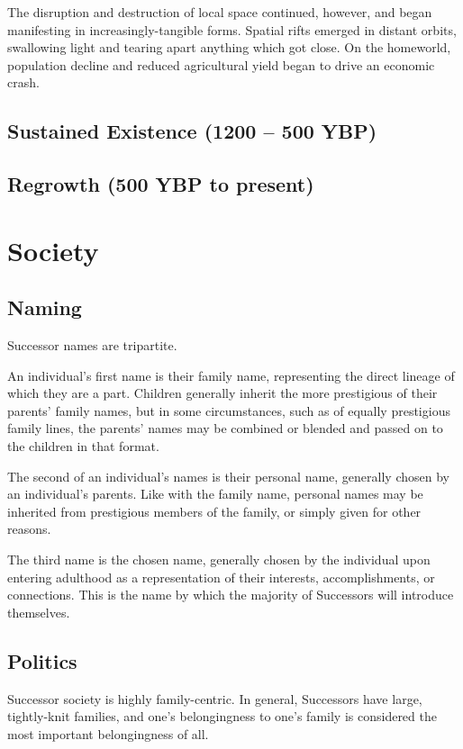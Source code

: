 \documentclass[11pt]{report}
\begin{document}
    The disruption and destruction of local space continued, however, and began manifesting in increasingly-tangible forms. Spatial rifts emerged in distant orbits, swallowing light and tearing apart anything which got close. On the homeworld, population decline and reduced agricultural yield began to drive an economic crash. 

    \subsection{Sustained Existence (1200 -- 500 YBP)}
    \subsection{Regrowth (500 YBP to present)}
    \section{Society}
    \subsection{Naming}
    Successor names are tripartite.
    
    An individual's first name is their family name, representing the direct lineage of which they are a part. Children generally inherit the more prestigious of their parents' family names, but in some circumstances, such as of equally prestigious family lines, the parents' names may be combined or blended and passed on to the children in that format.

    The second of an individual's names is their personal name, generally chosen by an individual's parents. Like with the family name, personal names may be inherited from prestigious members of the family, or simply given for other reasons.

    The third name is the chosen name, generally chosen by the individual upon entering adulthood as a representation of their interests, accomplishments, or connections. This is the name by which the majority of Successors will introduce themselves.

    \subsection{Politics}
    Successor society is highly family-centric. In general, Successors have large, tightly-knit families, and one's belongingness to one's family is considered the most important belongingness of all. 
\end{document}
